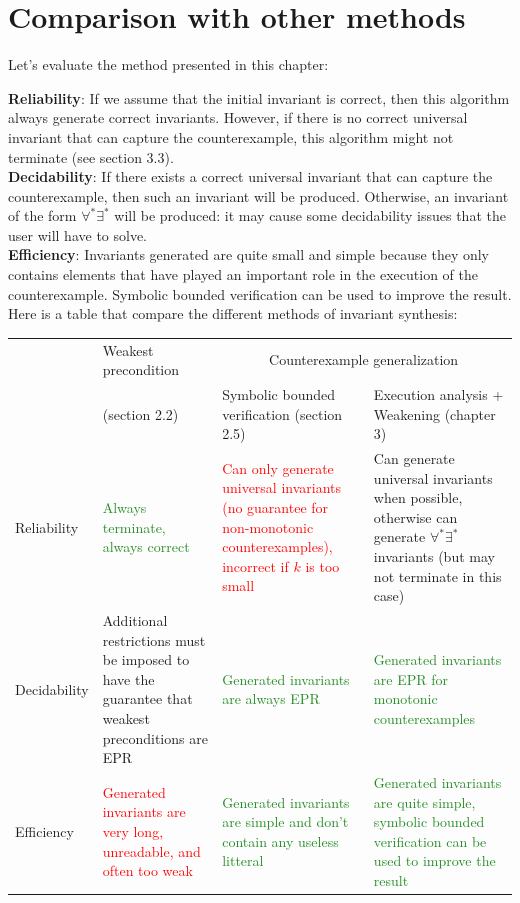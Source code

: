 \documentclass[11pt,a4paper,oldfontcommands,openany]{memoir}
\begin{document}
    \section{Comparison with other methods}

    Let's evaluate the method presented in this chapter:

    \textbf{Reliability}: If we assume that the initial invariant is correct, then this algorithm always generate correct invariants.
    However, if there is no correct universal invariant that can capture the counterexample, this algorithm might not terminate (see section 3.3).\\

    \textbf{Decidability}: If there exists a correct universal invariant that can capture the counterexample, then such an invariant will be produced.
    Otherwise, an invariant of the form \(\forall^*\exists^*\) will be produced: it may cause some decidability issues that the user will have to solve.\\

    \textbf{Efficiency}: Invariants generated are quite small and simple because they only contains elements that have played an important role in the execution of the counterexample.
    Symbolic bounded verification can be used to improve the result.\\

    Here is a table that compare the different methods of invariant synthesis:\\
    \begin{tabularx}{\textwidth}{|l|X|X|X|}
        \hline
            & Weakest precondition & \multicolumn{2}{c|}{Counterexample generalization}\\
        \cline{3-4}
            & (section 2.2) & Symbolic bounded verification (section 2.5) & Execution analysis + Weakening (chapter 3)\\
        \hline
            Reliability & \textcolor{ForestGreen}{Always terminate, always correct} &
            \textcolor{Red}{Can only generate universal invariants (no guarantee for non-monotonic counterexamples), incorrect if \(k\) is too small}
            & \textcolor{Dandelion}{Can generate universal invariants when possible, otherwise can generate \(\forall^*\exists^*\) invariants (but may not terminate in this case)}\\
        \hline
            Decidability & \textcolor{Dandelion}{Additional restrictions must be imposed to have the guarantee that weakest preconditions are EPR}
            & \textcolor{ForestGreen}{Generated invariants are always EPR}
            & \textcolor{ForestGreen}{Generated invariants are EPR for monotonic counterexamples}\\
        \hline
            Efficiency & \textcolor{Red}{Generated invariants are very long, unreadable, and often too weak}
            & \textcolor{ForestGreen}{Generated invariants are simple and don't contain any useless litteral}
            & \textcolor{ForestGreen}{Generated invariants are quite simple, symbolic bounded verification can be used to improve the result}\\
        \hline
    \end{tabularx}\\
\end{document}

